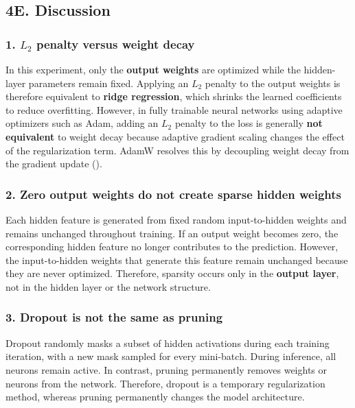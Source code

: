 \documentclass[
  11pt,
]{article}
\begin{document}
\subsection{4E. Discussion}\label{e.-discussion}

\subsubsection{\texorpdfstring{1. \(L_2\) penalty versus weight
decay}{1. L\_2 penalty versus weight decay}}\label{l_2-penalty-versus-weight-decay}

In this experiment, only the \textbf{output weights} are optimized while
the hidden-layer parameters remain fixed. Applying an \(L_2\) penalty to
the output weights is therefore equivalent to \textbf{ridge regression},
which shrinks the learned coefficients to reduce overfitting. However,
in fully trainable neural networks using adaptive optimizers such as
Adam, adding an \(L_2\) penalty to the loss is generally \textbf{not
equivalent} to weight decay because adaptive gradient scaling changes
the effect of the regularization term. AdamW resolves this by decoupling
weight decay from the gradient update
().

\subsubsection{2. Zero output weights do not create sparse hidden
weights}\label{zero-output-weights-do-not-create-sparse-hidden-weights}

Each hidden feature is generated from fixed random input-to-hidden
weights and remains unchanged throughout training. If an output weight
becomes zero, the corresponding hidden feature no longer contributes to
the prediction. However, the input-to-hidden weights that generate this
feature remain unchanged because they are never optimized. Therefore,
sparsity occurs only in the \textbf{output layer}, not in the hidden
layer or the network structure.

\subsubsection{3. Dropout is not the same as
pruning}\label{dropout-is-not-the-same-as-pruning}

Dropout randomly masks a subset of hidden activations during each
training iteration, with a new mask sampled for every mini-batch. During
inference, all neurons remain active. In contrast, pruning permanently
removes weights or neurons from the network. Therefore, dropout is a
temporary regularization method, whereas pruning permanently changes the
model architecture.
\end{document}
